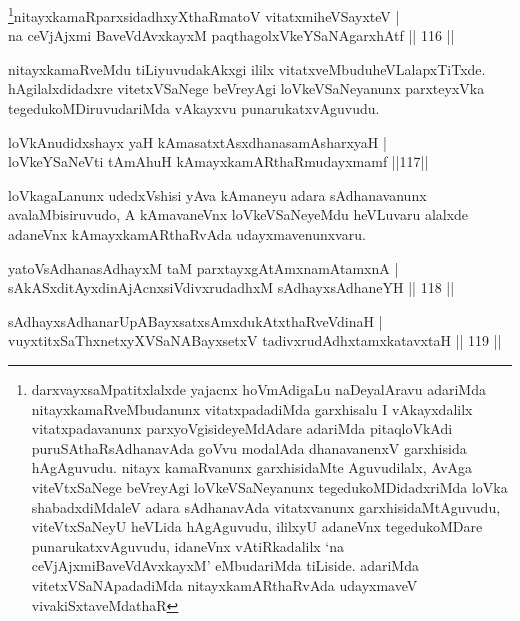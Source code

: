 \begin{shl}
\footnote{darxvayxsaMpatitxlalxde yajacnx hoVmAdigaLu naDeyalAravu adariMda nitayxkamaR\-veMbudanunx vitatxpadadiMda garxhisalu I vAkayxdalilx vitatxpadavanunx parxyoVgisideyeMdAdare adariMda pitaqloVkAdi puruSAthaRsAdhanavAda goVvu modalAda dhanavanenxV garxhisida hAgAguvudu. nitayx kamaRvanunx garxhisidaMte Aguvudilalx, AvAga viteVtxSaNege beVreyAgi loVkeVSaNeyanunx tegedukoMDidadxriMda loVka shabadxdiMdaleV adara sAdhanavAda vitatxvanunx garxhisidaMtAguvudu, viteVtxSaNeyU heVLida hAgAguvudu, ililxyU adaneVnx tegedukoMDare punarukatxvAguvudu, idaneVnx vAtiRkadalilx `na ceVjAjxmiBaveVdAvxkayxM' eMbudariMda tiLiside. adariMda vitetxVSaNApadadiMda nitayxkamARthaRvAda udayxmaveV vivakiSxtaveMdathaR}nitayxkamaRparxsidadhxyXthaRmatoV vitatxmiheVSayxteV |\\
na ceVjAjxmi BaveVdAvxkayxM paqthagolxVkeYSaNAgarxhAtf \hfill || 116 ||
\end{shl}

\begin{artha}
nitayxkamaRveMdu tiLiyuvudakAkxgi ililx vitatxveMbudu\break heVLalapxTiTxde. hAgilalxdidadxre vitetxVSaNege beVreyAgi loVkeVSaNeyanunx parxteyxVka tegedukoMDiruvudariMda vAkayxvu punarukatxvAguvudu.
\end{artha}

\begin{shl}
loVkAnudidxshayx yaH kAmasatxtAsxdhanasamAsharxyaH |\\
loVkeYSaNeVti tAmAhuH kAmayxkamARthaRmudayxmamf \hfill ||117||
\end{shl}

\begin{artha}%
loVkagaLanunx udedxVshisi yAva kAmaneyu adara sAdhanavanunx avalaMbisiruvudo, A kAmavaneVnx loVkeVSaNeyeMdu heVLuvaru alalxde adaneVnx kAmayxkamARthaRvAda udayxmavenunxvaru.
\end{artha}

\begin{shl}
yatoV\s sAdhanasAdhayxM taM parxtayxgAtAmxnamAtamxnA |\\
sAkASxditAyxdinA\s jAcnxsiVdivxrudadhxM sAdhayxsAdhaneYH \hfill || 118 ||
\end{shl}

\begin{shl}
sAdhayxsAdhanarUpABayxsatxsAmxdukAtxthaRveVdinaH |\\
vuyxtitxSaThxnetxyXVSaNABayxsetxV tadivxrudAdhxtamxkatavxtaH \hfill || 119 ||
\end{shl}

